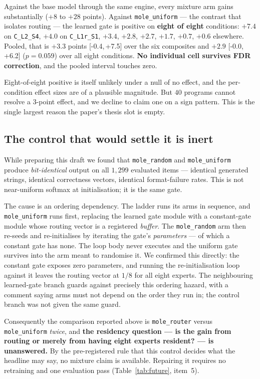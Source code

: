 \documentclass[sigconf,review,anonymous]{acmart}
\newcommand{\arm}[1]{\texttt{#1}}
\newcommand{\cond}[1]{\texttt{#1}}
\newcommand{\ci}[2]{{\small[#1,\,#2]}}
\begin{document}
Against the base model through the same engine, every mixture arm gains substantially
($+8$ to $+28$ points). Against \arm{mole\_uniform} --- the contrast that isolates routing --- the
learned gate is positive on \textbf{eight of eight} conditions: $+7.4$ on \cond{C\_L2\_S4},
$+4.0$ on \cond{C\_L1r\_S1}, $+3.4$, $+2.8$, $+2.7$, $+1.7$, $+0.7$, $+0.6$ elsewhere. Pooled,
that is $+3.3$ points \ci{-0.4}{+7.5} over the six composites and $+2.9$ \ci{-0.0}{+6.2}
($p=0.059$) over all eight conditions. \textbf{No individual cell survives FDR correction}, and
the pooled interval touches zero.

Eight-of-eight positive is itself unlikely under a null of no effect, and the per-condition
effect sizes are of a plausible magnitude. But $40$ programs cannot resolve a $3$-point effect,
and we decline to claim one on a sign pattern. This is the single largest reason the paper's
thesis slot is empty.

\subsection{The control that would settle it is inert}
\label{sec:inert}

While preparing this draft we found that \arm{mole\_random} and \arm{mole\_uniform} produce
\emph{bit-identical} output on all $1{,}299$ evaluated items --- identical generated strings,
identical correctness vectors, identical format-failure rates. This is not near-uniform softmax
at initialisation; it is the same gate.

The cause is an ordering dependency. The ladder runs its arms in sequence, and
\arm{mole\_uniform} runs first, replacing the learned gate module with a constant-gate module
whose routing vector is a registered \emph{buffer}. The \arm{mole\_random} arm then re-seeds and
re-initialises by iterating the gate's \emph{parameters} --- of which a constant gate has none.
The loop body never executes and the uniform gate survives into the arm meant to randomise it.
We confirmed this directly: the constant gate exposes zero parameters, and running the
re-initialisation loop against it leaves the routing vector at $1/8$ for all eight experts. The
neighbouring learned-gate branch guards against precisely this ordering hazard, with a comment
saying arms must not depend on the order they run in; the control branch was not given the same
guard.

Consequently the comparison reported above is \arm{mole\_router} versus \arm{mole\_uniform}
\emph{twice}, and \textbf{the residency question --- is the gain from routing or merely from
having eight experts resident? --- is unanswered.} By the pre-registered rule that this control
decides what the headline may say, no mixture claim is available. Repairing it requires no
retraining and one evaluation pass (Table~\ref{tab:future}, item~5).
\end{document}
